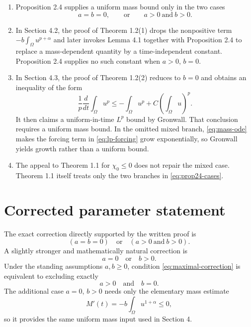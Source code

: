 \documentclass[11pt]{article}
\newcommand{\Om}{\Omega}
\begin{document}
\begin{enumerate}[leftmargin=2em]
\item Proposition 2.4 supplies a uniform mass bound only in the two cases
\begin{equation}
  a=b=0,
  \qquad\text{or}\qquad
  a>0\ \text{and}\ b>0.
  \label{eq:prop24-cases}
\end{equation}

\item In Section 4.2, the proof of Theorem 1.2(1) drops the nonpositive term
$-b\int_\Om u^{p+\alpha}$ and later invokes Lemma 4.1 together with
Proposition 2.4 to replace a mass-dependent quantity by a time-independent
constant.  Proposition 2.4 supplies no such constant when $a>0$, $b=0$.

\item In Section 4.3, the proof of Theorem 1.2(2) reduces to $b=0$ and obtains
an inequality of the form
\begin{equation}
  \frac1p\frac{d}{dt}\int_\Om u^p
  \leq -\int_\Om u^p
       +C\left(\int_\Om u\right)^p.
  \label{eq:lp-forcing}
\end{equation}
It then claims a uniform-in-time $L^p$ bound by Gronwall.  That conclusion
requires a uniform mass bound.  In the omitted mixed branch,
\eqref{eq:mass-ode} makes the forcing term in \eqref{eq:lp-forcing} grow
exponentially, so Gronwall yields growth rather than a uniform bound.

\item The appeal to Theorem 1.1 for $\chi_0\leq0$ does not repair the mixed
case.  Theorem 1.1 itself treats only the two branches in
\eqref{eq:prop24-cases}.
\end{enumerate}

\section{Corrected parameter statement}

The exact correction directly supported by the written proof is
\begin{equation}
  (a=b=0)\quad\text{or}\quad(a>0\ \text{and}\ b>0).
  \label{eq:proof-supported}
\end{equation}
A slightly stronger and mathematically natural correction is
\begin{equation}
  a=0\quad\text{or}\quad b>0.
  \label{eq:maximal-correction}
\end{equation}
Under the standing assumptions $a,b\geq0$, condition
\eqref{eq:maximal-correction} is equivalent to excluding exactly
\begin{equation}
  a>0\quad\text{and}\quad b=0.
\end{equation}
The additional case $a=0$, $b>0$ needs only the elementary mass estimate
\begin{equation}
  M'(t)=-b\int_\Om u^{1+\alpha}\leq0,
\end{equation}
so it provides the same uniform mass input used in Section 4.
\end{document}
